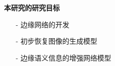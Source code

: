 \documentclass[CJK,aspectratio=169]{beamer}  %
\begin{document}
	\begin{frame}
		{ \yahei \textbf{本研究的研究目标}}
		
		\begin{itemize}
			\item [-]
			边缘网络的开发
			
			\vspace{-0.05cm}
			
			\item [-]
			初步恢复图像的生成模型
	
			\vspace{-0.05cm}
			
			\item [-]
			边缘语义信息的增强网络模型
		\end{itemize}
		
	\end{frame}
	
\end{document}
